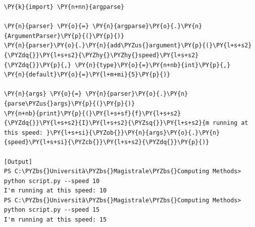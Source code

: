 \begin{Verbatim}[label=\makebox{\url{argparse_example.py}},commandchars=\\\{\}]
\PY{k}{import} \PY{n+nn}{argparse}

\PY{n}{parser} \PY{o}{=} \PY{n}{argparse}\PY{o}{.}\PY{n}{ArgumentParser}\PY{p}{(}\PY{p}{)}
\PY{n}{parser}\PY{o}{.}\PY{n}{add\PYZus{}argument}\PY{p}{(}\PY{l+s+s2}{\PYZdq{}}\PY{l+s+s2}{\PYZhy{}\PYZhy{}speed}\PY{l+s+s2}{\PYZdq{}}\PY{p}{,} \PY{n}{type}\PY{o}{=}\PY{n+nb}{int}\PY{p}{,} \PY{n}{default}\PY{o}{=}\PY{l+m+mi}{5}\PY{p}{)}

\PY{n}{args} \PY{o}{=} \PY{n}{parser}\PY{o}{.}\PY{n}{parse\PYZus{}args}\PY{p}{(}\PY{p}{)}
\PY{n+nb}{print}\PY{p}{(}\PY{l+s+sf}{f}\PY{l+s+s2}{\PYZdq{}}\PY{l+s+s2}{I}\PY{l+s+s2}{\PYZsq{}}\PY{l+s+s2}{m running at this speed: }\PY{l+s+si}{\PYZob{}}\PY{n}{args}\PY{o}{.}\PY{n}{speed}\PY{l+s+si}{\PYZcb{}}\PY{l+s+s2}{\PYZdq{}}\PY{p}{)}

[Output]
PS C:\PYZbs{}Università\PYZbs{}Magistrale\PYZbs{}Computing Methods> python script.py --speed 10
I'm running at this speed: 10
PS C:\PYZbs{}Università\PYZbs{}Magistrale\PYZbs{}Computing Methods> python script.py --speed 15
I'm running at this speed: 15
\end{Verbatim}